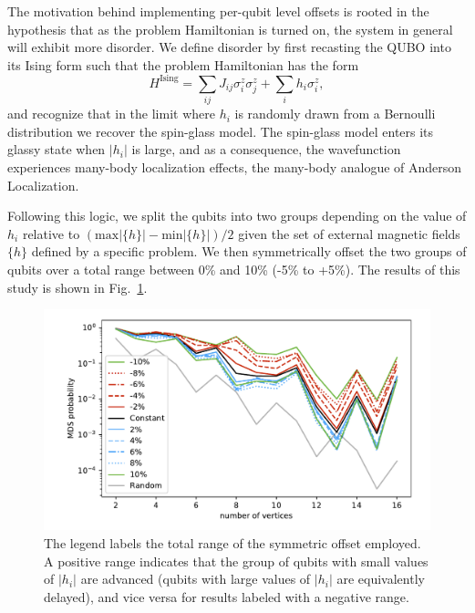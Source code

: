 \documentclass[prd,twocolumn,tightenlines,preprintnumbers,showpacs,superscriptaddress,notitlepage,nofootinbib,eqsecnum,floatfix,longbibliography]{revtex4}
\begin{document}
The motivation behind implementing per-qubit level offsets is rooted in the hypothesis that as the problem Hamiltonian is turned on, the system in general will exhibit more disorder. We define disorder by first recasting the QUBO into its Ising form such that the problem Hamiltonian has the form
\begin{equation}
H^{\textrm{Ising}} = \sum_{ij} J_{ij} \sigma^z_i \sigma^z_j + \sum_i h_i \sigma^z_i,
\end{equation}
and recognize that in the limit where $h_i$ is randomly drawn from a Bernoulli distribution we recover the spin-glass model. The spin-glass model enters its glassy state when $|h_i|$ is large, and as a consequence, the wavefunction experiences many-body localization effects, the many-body analogue of Anderson Localization.

Following this logic, we split the qubits into two groups depending on the value of $h_i$ relative to $(\textrm{max}|\{h\}| - \textrm{min}|\{h\}|) / 2$ given the set of external magnetic fields $\{h\}$ defined by a specific problem. We then symmetrically offset the two groups of qubits over a total range between 0\% and 10\% (-5\% to +5\%). The results of this study is shown in Fig.~\ref{fig:dwave_offset}.

\begin{figure}[b]
	\centering
	\includegraphics[width=\columnwidth]{./figures/scaling_comparison_all.pdf}
	\caption{The legend labels the total range of the symmetric offset employed. A positive range indicates that the group of qubits with small values of $|h_i|$ are advanced (qubits with large values of $|h_i|$ are equivalently delayed), and vice versa for results labeled with a negative range.}
	\label{fig:dwave_offset}
\end{figure}
\end{document}
